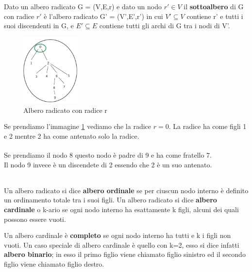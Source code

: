 \begin{definition}[Sottoalbero]
    Dato un albero radicato G = (V,E,r) e dato un nodo $r' \in V$ il \textbf{sottoalbero} di G con radice $r'$ è l'albero radicato G' = (V',E',r') in cui $V' \subseteq V$ contiene r' e tutti i suoi discendenti in G, e $E' \subseteq E$ contiene tutti gli archi di G tra i nodi di V'.
\end{definition}

\begin{figure}
    \vspace{-15pt}
    \centering
    \includegraphics[width=3cm]{images/es-albero-radicato.png}
    \caption{Albero radicato con radice r}
    \label{es-albero-radicato}
\end{figure}

Se prendiamo l'immagine \ref{es-albero-radicato} vediamo che la radice $r = 0$.
La radice ha come figli 1 e 2 mentre 2 ha come antenato solo la radice.\\\\
Se prendiamo il nodo 8 questo nodo è padre di 9 e ha come fratello 7.\\
Il nodo 9 invece è un discendete di 2 essendo che 2 è un suo antenato.\\\\

\begin{definition}
    Un albero radicato si dice \textbf{albero ordinale} se per ciuscun nodo interno è definito un ordinamento totale tra i suoi figli. Un albero radicato si dice \textbf{albero cardinale} o k-ario se ogni nodo interno ha esattamente k figli, alcuni dei quali possono essere vuoti.
\end{definition}

\begin{definition}
    Un albero cardinale è \textbf{completo} se ogni nodo interno ha tutti e k i figli non vuoti. Un caso speciale di albero cardinale è quello con k=2, esso si dice infatti \textbf{albero binario}; in esso il primo figlio viene chiamato figlio sinistro ed il secondo figlio viene chiamato figlio destro.
\end{definition}

